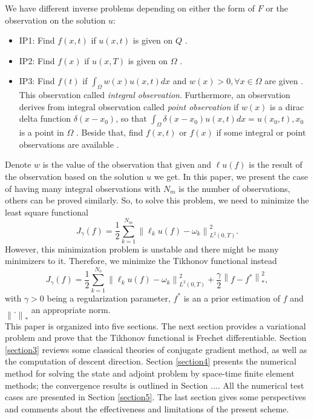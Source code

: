 \documentclass[]{article}
\begin{document}
We have different inverse problems depending on either the form of $F$ or the observation on the solution $u$: 
\begin{itemize}
	\item IP1: Find $f(x, t)$ if $u(x, t)$ is given on $Q$ \cite{a1, a2}.
	\item IP2: Find $f(x)$ if $u(x, T)$ is given on $\Omega$ \cite{a3, a4, a5, a6}.
	\item IP3: Find $f(t)$ if $\int_\Omega w(x)u(x, t)dx$ and $w(x)>0, \forall x\in \Omega$ are given \cite{a7, a8, a9}. This observation called \textit{integral observation}. Furthermore, an observation derives from integral observation called \textit{point observation} if $w(x)$ is a dirac delta function $\delta(x-x_0)$, so that $\int_\Omega\delta(x-x_0)u(x, t)dx=u(x_0, t), x_0$ is a point in $\Omega$ \cite{a10, a11, a12}. Beside that, find $f(x, t)$ or $f(x)$ if some integral or point observations are available \cite{a13}.
\end{itemize}
Denote $w$ is the value of the observation that given and $\ell u(f)$ is the result of the observation based on the solution $u$ we get. In this paper, we present  the case of having many integral observations with $N_m$ is the number of observations, others can be proved similarly. So, to solve this problem, we need to minimize the least square functional \cite{a14, a15}
$$J_{\gamma}(f)=\frac{1}{2}\sum_{k=1}^{N_{m}}\left\|\ell_k u(f)-\omega_k\right\|_{L^2(0, T)}^2.$$
However, this minimization problem is unstable and there might be many minimizers to it. Therefore, we minimize the Tikhonov functional instead
$$J_{\gamma}(f)=\frac{1}{2}\sum_{k=1}^{N_{o}}\left\|\ell_k u(f)-\omega_k\right\|_{L^2(0, T)}^2+\frac{\gamma}{2}\left\|f-f^*\right\|_{*}^2,$$
with $\gamma>0$ being a regularization parameter, $f^*$ is an a prior estimation of $f$ and $\left\|.\right\|_*$ an appropriate norm.
\\
This paper is organized into five sections. The next section provides a variational problem and prove that the Tikhonov functional is Frechet differentiable. Section \ref{section3} reviews some classical theories of conjugate gradient method, as well as the computation of descent direction. Section \ref{section4} presents the numerical method for solving the state and adjoint problem by space-time finite element methods; the convergence results is outlined in Section .... All the numerical test cases are presented in Section \ref{section5}. The last section gives some perspectives and comments about the effectiveness and limitations of the present scheme.
\end{document}
